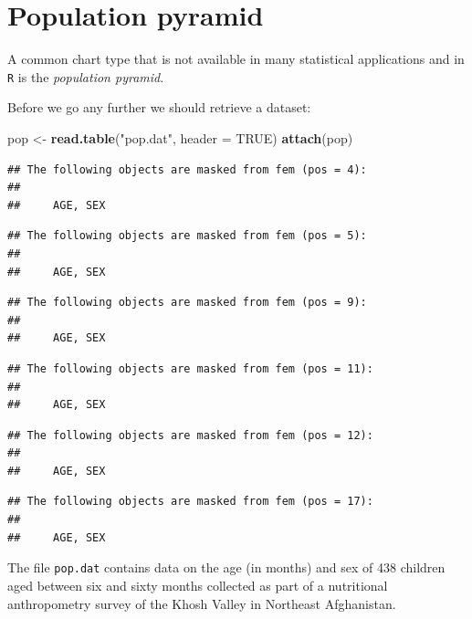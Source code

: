 \documentclass[12pt,]{book}
\newenvironment{Shaded}{\begin{snugshade}}{\end{snugshade}}
\newcommand{\KeywordTok}[1]{\textcolor[rgb]{0.13,0.29,0.53}{\textbf{#1}}}
\newcommand{\DataTypeTok}[1]{\textcolor[rgb]{0.13,0.29,0.53}{#1}}
\newcommand{\StringTok}[1]{\textcolor[rgb]{0.31,0.60,0.02}{#1}}
\newcommand{\OtherTok}[1]{\textcolor[rgb]{0.56,0.35,0.01}{#1}}
\newcommand{\NormalTok}[1]{#1}
\theoremstyle{definition}
\theoremstyle{definition}
\theoremstyle{definition}
\theoremstyle{remark}
\begin{document}
\hypertarget{population-pyramid}{%
\section{Population pyramid}\label{population-pyramid}}

A common chart type that is not available in many statistical
applications and in \texttt{R} is the \emph{population pyramid}.

Before we go any further we should retrieve a dataset:

\begin{Shaded}
\begin{Highlighting}[]
\NormalTok{pop <-}\StringTok{ }\KeywordTok{read.table}\NormalTok{(}\StringTok{"pop.dat"}\NormalTok{, }\DataTypeTok{header =} \OtherTok{TRUE}\NormalTok{)}
\KeywordTok{attach}\NormalTok{(pop)}
\end{Highlighting}
\end{Shaded}

\begin{verbatim}
## The following objects are masked from fem (pos = 4):
## 
##     AGE, SEX
\end{verbatim}

\begin{verbatim}
## The following objects are masked from fem (pos = 5):
## 
##     AGE, SEX
\end{verbatim}

\begin{verbatim}
## The following objects are masked from fem (pos = 9):
## 
##     AGE, SEX
\end{verbatim}

\begin{verbatim}
## The following objects are masked from fem (pos = 11):
## 
##     AGE, SEX
\end{verbatim}

\begin{verbatim}
## The following objects are masked from fem (pos = 12):
## 
##     AGE, SEX
\end{verbatim}

\begin{verbatim}
## The following objects are masked from fem (pos = 17):
## 
##     AGE, SEX
\end{verbatim}

The file \texttt{pop.dat} contains data on the age (in months) and sex
of 438 children aged between six and sixty months collected as part of a
nutritional anthropometry survey of the Khosh Valley in Northeast
Afghanistan.
\end{document}
